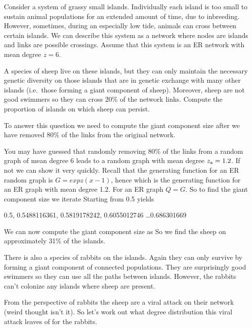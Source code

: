 
Consider a system of grassy small islands. Individually each island is too 
small to sustain animal populations for an extended amount of time, due to inbreeding. However, sometimes, during an especially low tide, animals can cross between certain islands. We can describe this system as a network where nodes are islands and links are possible crossings. Assume that this system is an ER network with mean degree $z=6$.

\subquestion A species of sheep live on these islands, but they can only maintain the necessary genetic diversity on those islands that are in genetic exchange with many other islands (i.e.~those forming a giant component of sheep). Moreover, sheep are not good swimmers so they can cross 20\% of the network links. Compute the proportion of islands on which sheep can persist.  

\solution
To answer this question we need to compute the giant component size after we have removed 80\% of the links from the original network.

You may have guessed that randomly removing 80\% of the links from a random graph of mean degree $6$ leads to a random graph with mean degree $z_{\rm a}=  1.2$. If not we can show it very quickly. Recall that the generating function for an ER random graph is $G=exp{z(x-1)}$, hence
which is the generating function for an ER graph with mean degree 1.2. For an ER graph $Q=G$. So to find the giant component size we iterate
Starting from 0.5 yields
\begin{center}
0.5, 0.5488116361, 0.5819178242, 0.6055012746 \ldots 0.686301669 
\end{center}
We can now compute the giant component size as
So we find the sheep on approximately 31\% of the islands.

\subquestion There is also a species of rabbits on the islands. Again they can only survive by forming a giant component of connected populations. They are surprisingly good swimmers so they can use all the paths between islands. However, the rabbits can't colonize any islands where sheep are present. 

\solution 
From the perspective of rabbits the sheep are a viral attack on their network (weird thought isn't it). So let's work out what degree distribution this viral attack leaves of for the rabbits. 

